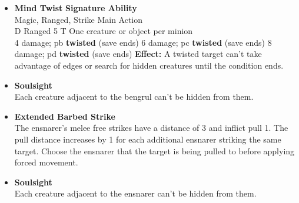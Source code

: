 \documentclass[letterpaper,openany,twoside,twocolumn]{book}
\begin{document}
	\begin{DsMinion}
		\DsMinionInformation[
			name			= {Twisted Bengrul},
			type			= {Abyssal, Demon},
			specification	= {Minion Hexer},
			cost			= {3 Essence for 2 Minions}
		]
		
		\DsMinionBasics[
			size		= {1L},
			speed		= {5},
			stamina		= {8},
			stability	= {2},
			free-strike	= {4},
			weakness	= {Holy 1},
			damage-type	= {Psychic}
		]
		
		\DsMinionStats[
			might		= +2,
			agility		= +1,
			reason		= -1,
			intuition	= -1,
			presence	= 0
		]
		
		\begin{itemize}
			\item[\dsglyphs >] \textbf{Mind Twist} \hfill\textbf{Signature Ability}\\
				Magic, Ranged, Strike \hfill Main Action\\
				{\dsglyphs D} Ranged 5 \hfill {\dsglyphs T} One creature or object per minion\\
				\DisplayPowerRoll[ability]{+\ReasonStatValue}
					{4 damage; {\dsglyphs pb} \textbf{twisted} (save ends)}
					{6 damage; {\dsglyphs pc} \textbf{twisted} (save ends)}
					{8 damage; {\dsglyphs pd} \textbf{twisted} (save ends)}
				\textbf{Effect:} A twisted target can't take advantage of edges or search for hidden creatures until the condition ends.
			\item[\dsglyphs *] \textbf{Soulsight}\\Each creature adjacent to the bengrul can't be hidden from them.
		\end{itemize}
	\end{DsMinion}
	\vfill\eject
	\begin{DsMinion}
		\DsMinionInformation[
			name			= {Ensnarer},
			type			= {Abyssal, Demon},
			specification	= {Signature Minion Brute},
			cost			= {1 Essence per Minion summoned}
		]
		
		\DsMinionBasics[
			size		= {1M},
			speed		= {5},
			stamina		= {5},
			stability	= {1},
			free-strike	= {2},
			weakness	= {Holy 1},
		]
		
		\DsMinionStats[
			might		= +2,
			agility		= 0,
			reason		= -1,
			intuition	= -1,
			presence	= -1
		]
		
		\begin{itemize}
			\item[\dsglyphs *] \textbf{Extended Barbed Strike}\\The ensnarer's melee free strikes have a distance of 3 and inflict pull 1. The pull distance increases by 1 for each additional ensnarer striking the same target. Choose the ensnarer that the target is being pulled to before applying forced movement.
			\item[\dsglyphs *] \textbf{Soulsight}\\Each creature adjacent to the ensnarer can't be hidden from them.
		\end{itemize}
	\end{DsMinion}
	
\end{document}
